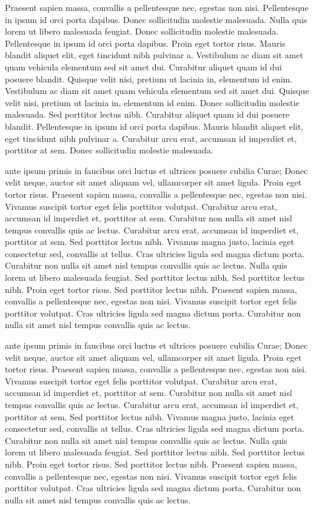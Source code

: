 \documentclass{article}
\begin{document}
Praesent sapien massa, convallis a pellentesque nec, egestas non nisi. Pellentesque in ipsum id orci porta dapibus. Donec sollicitudin molestie malesuada. Nulla quis lorem ut libero malesuada feugiat. Donec sollicitudin molestie malesuada. Pellentesque in ipsum id orci porta dapibus. Proin eget tortor risus. Mauris blandit aliquet elit, eget tincidunt nibh pulvinar a. Vestibulum ac diam sit amet quam vehicula elementum sed sit amet dui. Curabitur aliquet quam id dui posuere blandit. Quisque velit nisi, pretium ut lacinia in, elementum id enim. Vestibulum ac diam sit amet quam vehicula elementum sed sit amet dui. Quisque velit nisi, pretium ut lacinia in, elementum id enim. Donec sollicitudin molestie malesuada. Sed porttitor lectus nibh. Curabitur aliquet quam id dui posuere blandit. Pellentesque in ipsum id orci porta dapibus. Mauris blandit aliquet elit, eget tincidunt nibh pulvinar a. Curabitur arcu erat, accumsan id imperdiet et, porttitor at sem. Donec sollicitudin molestie malesuada.

 ante ipsum primis in faucibus orci luctus et ultrices posuere cubilia Curae; Donec velit neque, auctor sit amet aliquam vel, ullamcorper sit amet ligula. Proin eget tortor risus. Praesent sapien massa, convallis a pellentesque nec, egestas non nisi. Vivamus suscipit tortor eget felis porttitor volutpat. Curabitur arcu erat, accumsan id imperdiet et, porttitor at sem. Curabitur non nulla sit amet nisl tempus convallis quis ac lectus. Curabitur arcu erat, accumsan id imperdiet et, porttitor at sem. Sed porttitor lectus nibh. Vivamus magna justo, lacinia eget consectetur sed, convallis at tellus. Cras ultricies ligula sed magna dictum porta. Curabitur non nulla sit amet nisl tempus convallis quis ac lectus. Nulla quis lorem ut libero malesuada feugiat. Sed porttitor lectus nibh. Sed porttitor lectus nibh. Proin eget tortor risus. Sed porttitor lectus nibh. Praesent sapien massa, convallis a pellentesque nec, egestas non nisi. Vivamus suscipit tortor eget felis porttitor volutpat. Cras ultricies ligula sed magna dictum porta. Curabitur non nulla sit amet nisl tempus convallis quis ac lectus.

ante ipsum primis in faucibus orci luctus et ultrices posuere cubilia Curae; Donec velit neque, auctor sit amet aliquam vel, ullamcorper sit amet ligula. Proin eget tortor risus. Praesent sapien massa, convallis a pellentesque nec, egestas non nisi. Vivamus suscipit tortor eget felis porttitor volutpat. Curabitur arcu erat, accumsan id imperdiet et, porttitor at sem. Curabitur non nulla sit amet nisl tempus convallis quis ac lectus. Curabitur arcu erat, accumsan id imperdiet et, porttitor at sem. Sed porttitor lectus nibh. Vivamus magna justo, lacinia eget consectetur sed, convallis at tellus. Cras ultricies ligula sed magna dictum porta. Curabitur non nulla sit amet nisl tempus convallis quis ac lectus. Nulla quis lorem ut libero malesuada feugiat. Sed porttitor lectus nibh. Sed porttitor lectus nibh. Proin eget tortor risus. Sed porttitor lectus nibh. Praesent sapien massa, convallis a pellentesque nec, egestas non nisi. Vivamus suscipit tortor eget felis porttitor volutpat. Cras ultricies ligula sed magna dictum porta. Curabitur non nulla sit amet nisl tempus convallis quis ac lectus.
\end{document}

